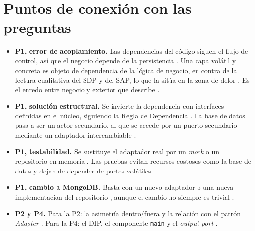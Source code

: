 \section{Puntos de conexión con las preguntas}

\begin{itemize}
  \item \textbf{P1, error de acoplamiento.} Las dependencias del código siguen el flujo de control, así que el negocio depende de la persistencia \parencites[pp.~44--45]{martin2017}[p.~64]{delatorre2010}. Una capa volátil y concreta es objeto de dependencia de la lógica de negocio, en contra de la lectura cualitativa del SDP  y del SAP, lo que la sitúa en la zona de dolor \citep[pp.~126, 129]{martin2017}. Es el enredo entre negocio y exterior que describe \citet[«Nature of the Solution»]{cockburn2005}.
  \item \textbf{P1, solución estructural.} Se invierte la dependencia con interfaces definidas en el núcleo, siguiendo la Regla de Dependencia \citep[pp.~203, 206]{martin2017}. La base de datos pasa a ser un actor secundario, al que se accede por un puerto secundario mediante un adaptador intercambiable \citep[«Nature of the Solution», «The Left-Right Asymmetry»]{cockburn2005}.
  \item \textbf{P1, testabilidad.} Se sustituye el adaptador real por un \emph{mock} o un repositorio en memoria \parencites[«Sample Code»]{cockburn2005}[p.~214]{martin2017}[pp.~105, 146]{delatorre2010}. Las pruebas evitan recursos costosos como la base de datos  y dejan de depender de partes volátiles .
  \item \textbf{P1, cambio a MongoDB.} Basta con un nuevo adaptador o una nueva implementación del repositorio \parencites[pp.~170--171, 202]{martin2017}[p.~146]{delatorre2010}, aunque el cambio no siempre es trivial .
  \item \textbf{P2 y P4.} Para la P2: la asimetría dentro/fuera y la relación con el patrón \emph{Adapter} \citep[«Nature of the Solution», «Related Patterns»]{cockburn2005}. Para la P4: el DIP, el componente \texttt{main} y el \emph{output port} \citep[pp.~87--91, 206]{martin2017}.
\end{itemize}


